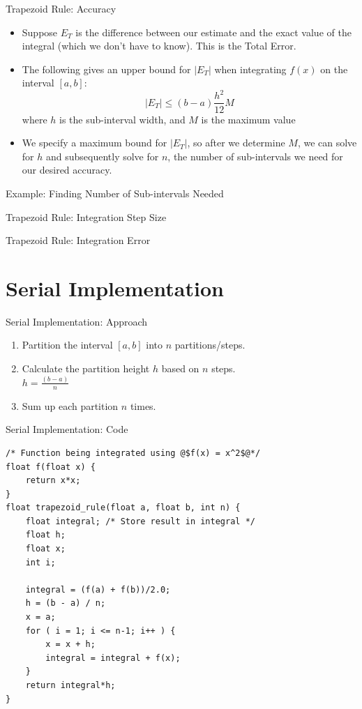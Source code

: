 \documentclass[t]{beamer}
\begin{document}
\begin{frame}{Trapezoid Rule: Accuracy}
\begin{itemize}
\item Suppose $E_T$ is the difference between our estimate and the exact value of the integral (which we don't have to know). This is the Total Error.
\item The following gives an upper bound for $|E_T|$ when integrating $f(x)$ on the interval $[a,b]$:
\[|E_T|\leq(b-a)\frac{h^2}{12}M\]
where $h$ is the sub-interval width, and $M$ is the maximum value
\item We specify a maximum bound for $|E_T|$, so after we determine $M$, we can solve for $h$ and subsequently solve for $n$, the number of sub-intervals we need for our desired accuracy.
\end{itemize}
\end{frame}

\begin{frame}{Example: Finding Number of Sub-intervals Needed}
\end{frame}



\begin{frame}{Trapezoid Rule: Integration Step Size}
\end{frame}

\begin{frame}{Trapezoid Rule: Integration Error}
\end{frame}

\section{Serial Implementation}
\begin{frame}{Serial Implementation: Approach}
	\begin{enumerate}
		\item Partition the interval $[a,b]$ into $n$ partitions/steps.
		\item Calculate the partition height $h$ based on $n$ steps. \\
			$h = \frac{(b-a)}{n}$
		\item Sum up each partition $n$ times.
	\end{enumerate}
\end{frame}

\begin{frame}[containsverbatim]{Serial Implementation: Code}
\begin{verbatim}
/* Function being integrated using @$f(x) = x^2$@*/
float f(float x) {
	return x*x;
}
float trapezoid_rule(float a, float b, int n) {
	float integral; /* Store result in integral */
	float h;
	float x;
	int i;

	integral = (f(a) + f(b))/2.0;
	h = (b - a) / n;
	x = a;
	for ( i = 1; i <= n-1; i++ ) {
		x = x + h;
		integral = integral + f(x);
	}
	return integral*h;
}
\end{verbatim}
\end{frame}
\end{document}
